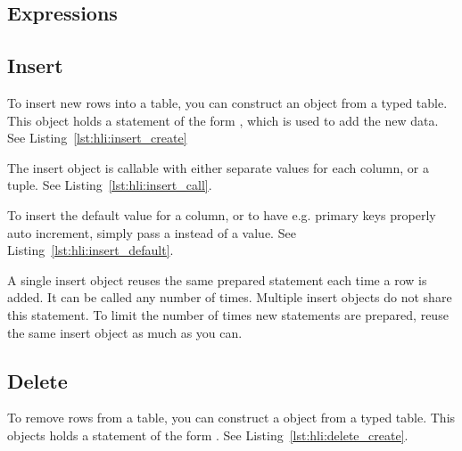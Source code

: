 

\subsection{Expressions}
\label{section:hli:expression}


\subsection{Insert}
\label{section:hli:insert}

To insert new rows into a table, you can construct an  object from a typed table. This object holds a statement of the form , which is used to add the new data. See Listing~\ref{lst:hli:insert_create}



The insert object is callable with either separate values for each column, or a tuple. See Listing~\ref{lst:hli:insert_call}.



To insert the default value for a column, or to have e.g. primary keys properly auto increment, simply pass a  instead of a value. See Listing~\ref{lst:hli:insert_default}.



A single insert object reuses the same prepared statement each time a row is added. It can be called any number of times. Multiple insert objects do not share this statement. To limit the number of times new statements are prepared, reuse the same insert object as much as you can.

\subsection{Delete}
\label{section:hli:delete}

To remove rows from a table, you can construct a  object from a typed table. This objects holds a statement of the form . See Listing~\ref{lst:hli:delete_create}.

